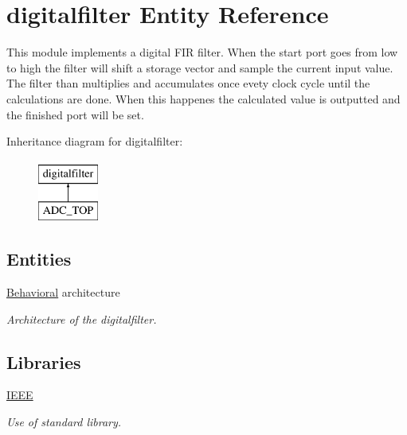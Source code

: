 \hypertarget{classdigitalfilter}{\section{digitalfilter Entity Reference}
\label{classdigitalfilter}
}


This module implements a digital F\-I\-R filter. When the start port goes from low to high the filter will shift a storage vector and sample the current input value. The filter than multiplies and accumulates once evety clock cycle until the calculations are done. When this happenes the calculated value is outputted and the finished port will be set.  


Inheritance diagram for digitalfilter\-:\begin{figure}[H]
\begin{center}
\leavevmode
\includegraphics[height=2.000000cm]{classdigitalfilter}
\end{center}
\end{figure}
\subsection*{Entities}
\begin{DoxyCompactItemize}
\item 
\hyperlink{classdigitalfilter_1_1Behavioral}{Behavioral} architecture
\begin{DoxyCompactList}\small\item\em Architecture of the digitalfilter. \end{DoxyCompactList}\end{DoxyCompactItemize}
\subsection*{Libraries}
 \begin{DoxyCompactItemize}
\item 
\hypertarget{classdigitalfilter_ae4f03c286607f3181e16b9aa12d0c6d4}{\hyperlink{classdigitalfilter_ae4f03c286607f3181e16b9aa12d0c6d4}{I\-E\-E\-E} }\label{classdigitalfilter_ae4f03c286607f3181e16b9aa12d0c6d4}

\begin{DoxyCompactList}\small\item\em Use of standard library. \end{DoxyCompactList}\end{DoxyCompactItemize}
